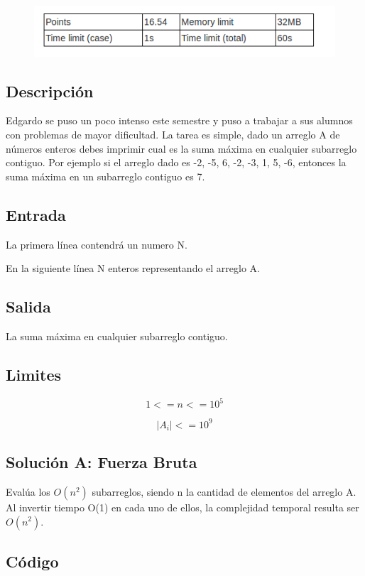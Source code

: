 \documentclass[12pt, fleqn]{article}                             %
\theoremstyle{break}                                            %
\begin{document}
\begin{figure}[H]
               \centering
                \includegraphics[scale=1]{T1}
            \end{figure}
\subsection{Descripción}
Edgardo se puso un poco intenso este semestre y puso a trabajar a sus alumnos con problemas de mayor dificultad.
La tarea es simple, dado un arreglo A de números enteros debes imprimir cual es la suma máxima en cualquier subarreglo contiguo.
Por ejemplo si el arreglo dado es {-2, -5, 6, -2, -3, 1, 5, -6}, entonces la suma máxima en un subarreglo contiguo es 7.

\subsection{Entrada}
La primera línea contendrá un numero N.

En la siguiente línea N enteros representando el arreglo A.
\subsection{Salida}

La suma máxima en cualquier subarreglo contiguo.
\subsection{Limites}
\begin{equation*}
    1<=n<=10^5
\end{equation*}

\begin{equation*}
    |A_i|<=10^9
\end{equation*}

\subsection{Solución A: Fuerza Bruta}
Evalúa los $O(n^2)$ subarreglos, siendo n
la cantidad de elementos del arreglo A. Al invertir tiempo O(1) en cada uno
de ellos, la complejidad temporal resulta ser $O(n^2)$. 
\subsection{Código}

\end{document}
